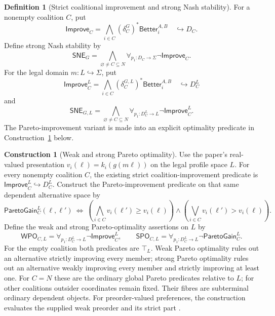 \documentclass[11pt,a4paper]{article}
\numberwithin{equation}{section}
\theoremstyle{definition}
\newtheorem{definition}[theorem]{Definition}
\newtheorem{construction}[construction]{Construction}
\theoremstyle{remark}
\theoremstyle{plain}
\begin{document}
\begin{definition}[Strict coalitional improvement and strong Nash stability]
\label{def:egt-strict-coalitional-improvement-and-strong-nash-stability}
For a nonempty coalition $C$, put
\begin{equation}\label{eq:egt-coalition-improve}
 \mathsf{Improve}_C=\bigwedge_{i\in C}
                  (\delta_C^G)^*\mathsf{Better}^{A,B}_i
 \quad\hookrightarrow D_C.
\end{equation}
Define strong Nash stability by
\begin{equation}\label{eq:egt-strong-nash-doctrine}
 \mathsf{SNE}_G=\bigwedge_{\varnothing\ne C\subseteq N}
       \forall_{p_1:D_C\to\Sigma}\neg\mathsf{Improve}_C.
\end{equation}
For the legal domain $m:L\hookrightarrow\Sigma$, put
\[
 \mathsf{Improve}_C^L=\bigwedge_{i\in C}
                    (\delta_C^{G,L})^*\mathsf{Better}^{A,B}_i
 \quad\hookrightarrow D_C^L
\]
and
\begin{equation}\label{eq:egt-legal-strong-nash}
 \mathsf{SNE}_{G,L}=\bigwedge_{\varnothing\ne C\subseteq N}
       \forall_{p_1:D_C^L\to L}\neg\mathsf{Improve}_C^L.
\end{equation}
The Pareto-improvement variant is made into an explicit optimality
predicate in Construction~\ref{con:egt-pareto-optimality} below.
\end{definition}

\begin{construction}[Weak and strong Pareto optimality]
\label{con:egt-pareto-optimality}
Use the paper's real-valued presentation
$v_i(\ell)=k_i(g(m\ell))$ on the legal profile space $L$.
For every nonempty coalition $C$, the existing strict coalition-improvement
predicate is $\mathsf{Improve}_C^L\hookrightarrow D_C^L$. Construct the
Pareto-improvement predicate on that same dependent alternative space by
\[
 \mathsf{ParetoGain}_C^L(\ell,\ell')\ \Longleftrightarrow\
 \left(\bigwedge_{i\in C}v_i(\ell')\geq v_i(\ell)\right)
 \wedge
 \left(\bigvee_{i\in C}v_i(\ell')>v_i(\ell)\right).
\]
Define the weak and strong Pareto-optimality assertions on $L$ by
\[
 \mathsf{WPO}_{C,L}
  =\forall_{p_1:D_C^L\to L}\neg\mathsf{Improve}_C^L,
 \qquad
 \mathsf{SPO}_{C,L}
  =\forall_{p_1:D_C^L\to L}\neg\mathsf{ParetoGain}_C^L.
\]
For the empty coalition both predicates are $\top_L$. Weak Pareto
optimality rules out an alternative strictly improving every member;
strong Pareto optimality rules out an alternative weakly improving every
member and strictly improving at least one. For $C=N$ these are the
ordinary global Pareto predicates relative to $L$; for other coalitions
outsider coordinates remain fixed. Their fibres are subterminal ordinary
dependent objects. For preorder-valued preferences, the construction evaluates the supplied weak preorder and its strict part \citep{ChenShiWang2022}.
\end{construction}
\end{document}
